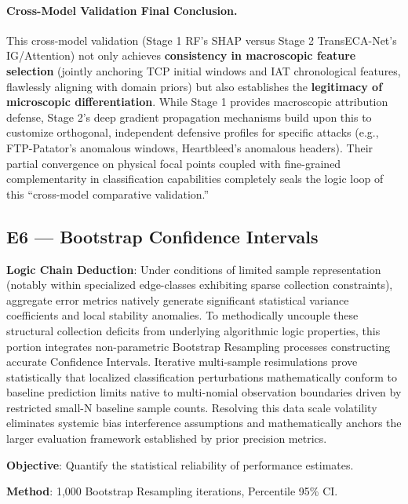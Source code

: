 \documentclass[sigconf]{acmart}
\begin{document}
\paragraph{Cross-Model Validation Final Conclusion.}
This cross-model validation (Stage 1 RF's SHAP versus Stage 2 TransECA-Net's IG/Attention) not only achieves \textbf{consistency in macroscopic feature selection} (jointly anchoring TCP initial windows and IAT chronological features, flawlessly aligning with domain priors) but also establishes the \textbf{legitimacy of microscopic differentiation}. While Stage 1 provides macroscopic attribution defense, Stage 2's deep gradient propagation mechanisms build upon this to customize orthogonal, independent defensive profiles for specific attacks (e.g., FTP-Patator's anomalous windows, Heartbleed's anomalous headers). Their partial convergence on physical focal points coupled with fine-grained complementarity in classification capabilities completely seals the logic loop of this ``cross-model comparative validation.''

\subsection{E6 --- Bootstrap Confidence Intervals}
\textbf{Logic Chain Deduction}: Under conditions of limited sample representation (notably within specialized edge-classes exhibiting sparse collection constraints), aggregate error metrics natively generate significant statistical variance coefficients and local stability anomalies. To methodically uncouple these structural collection deficits from underlying algorithmic logic properties, this portion integrates non-parametric Bootstrap Resampling processes constructing accurate Confidence Intervals. Iterative multi-sample resimulations prove statistically that localized classification perturbations mathematically conform to baseline prediction limits native to multi-nomial observation boundaries driven by restricted small-N baseline sample counts. Resolving this data scale volatility eliminates systemic bias interference assumptions and mathematically anchors the larger evaluation framework established by prior precision metrics.

\textbf{Objective}: Quantify the statistical reliability of performance estimates.

\textbf{Method}: 1,000 Bootstrap Resampling iterations, Percentile 95\% CI.
\end{document}

